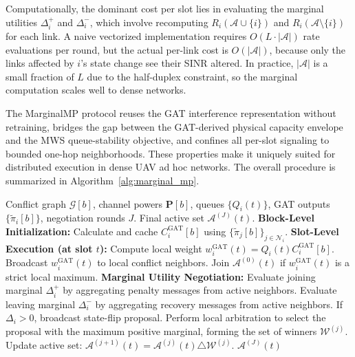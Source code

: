 \documentclass[letterpaper,journal]{IEEEtran}
\begin{document}
Computationally, the dominant cost per slot lies in evaluating the marginal utilities $\Delta_i^+$ and $\Delta_i^-$, which involve recomputing $R_i(\mathcal{A}\cup\{i\})$ and $R_i(\mathcal{A}\setminus\{i\})$ for each link. A naive vectorized implementation requires $O(L\cdot|\mathcal{A}|)$ rate evaluations per round, but the actual per-link cost is $O(|\mathcal{A}|)$, because only the links affected by $i$'s state change see their SINR altered. In practice, $|\mathcal{A}|$ is a small fraction of $L$ due to the half-duplex constraint, so the marginal computation scales well to dense networks.

The MarginalMP protocol reuses the GAT interference representation without retraining, bridges the gap between the GAT-derived physical capacity envelope and the MWS queue-stability objective, and confines all per-slot signaling to bounded one-hop neighborhoods. These properties make it uniquely suited for distributed execution in dense UAV ad hoc networks. The overall procedure is summarized in Algorithm~\ref{alg:marginal_mp}.

\begin{algorithm}[tb]
	\caption{GAT-Assisted Marginal Message Passing}
	\label{alg:marginal_mp}
	\begin{algorithmic}[1]
		\REQUIRE Conflict graph $\mathcal{G}[b]$, channel powers $\mathbf{P}[b]$, queues $\{Q_i(t)\}$, GAT outputs $\{\tilde{\pi}_i[b]\}$, negotiation rounds $J$.
		\ENSURE Final active set $\mathcal{A}^{(J)}(t)$.
		\STATE \textbf{Block-Level Initialization:}
		\STATE Calculate and cache $C_i^{\mathrm{GAT}}[b]$ using $\{\tilde{\pi}_j[b]\}_{j \in \mathcal{N}_i}$.
		\ENDFOR
		\STATE \textbf{Slot-Level Execution (at slot $t$):}
		\STATE Compute local weight $w_i^{\mathrm{GAT}}(t) = Q_i(t) C_i^{\mathrm{GAT}}[b]$.
		\STATE Broadcast $w_i^{\mathrm{GAT}}(t)$ to local conflict neighbors.
		\STATE Join $\mathcal{A}^{(0)}(t)$ if $w_i^{\mathrm{GAT}}(t)$ is a strict local maximum.
		\ENDFOR
		\STATE \textbf{Marginal Utility Negotiation:}
		\STATE Evaluate joining marginal $\Delta_i^+$ by aggregating penalty messages from active neighbors.
		\ELSE
		\STATE Evaluate leaving marginal $\Delta_i^-$ by aggregating recovery messages from active neighbors.
		\ENDIF
		\STATE If $\Delta_i > 0$, broadcast state-flip proposal.
		\ENDFOR
		\STATE Perform local arbitration to select the proposal with the maximum positive marginal, forming the set of winners $\mathcal{W}^{(j)}$.
		\STATE Update active set: $\mathcal{A}^{(j+1)}(t) = \mathcal{A}^{(j)}(t) \triangle \mathcal{W}^{(j)}$.
		\ENDFOR
		\RETURN $\mathcal{A}^{(J)}(t)$
	\end{algorithmic}
\end{algorithm}
	
\end{document}
